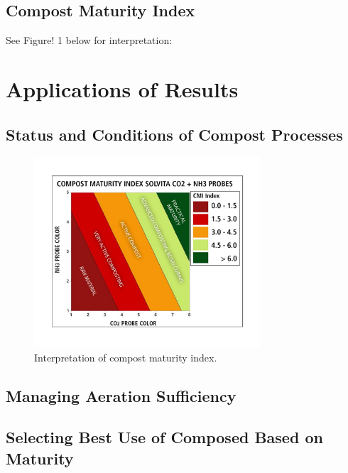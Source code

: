 \documentclass[12pt]{../SOP4_alpha}\usepackage[]{graphicx}\usepackage[]{xcolor}
\begin{document}


\subsection{Compost Maturity Index}

\NP See Figure! 1 below for interpretation:

\section{Applications of Results}

\subsection{Status and Conditions of Compost Processes}

\begin{figure}[ht]
\centering
\includegraphics[width=0.75\textwidth]{graphics/Solvita_CMI_Calculator}
\caption{Interpretation of compost maturity index.}
\label{fig:fig1}
\end{figure}

\subsection{Managing Aeration Sufficiency}

\subsection{Selecting Best Use of Composed Based on Maturity}
\end{document}

